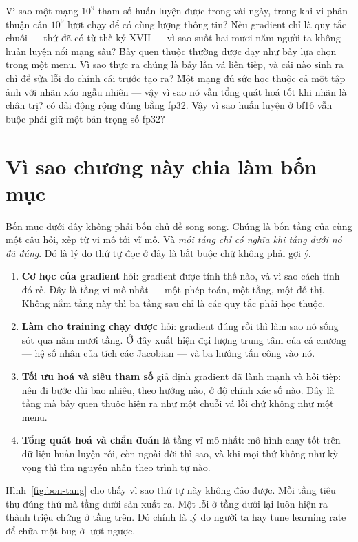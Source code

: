 \documentclass[../../deep_learning.tex]{subfiles}
\begin{document}
\begin{khoigoi}
\h{Vì sao một mạng \(10^9\) tham số huấn luyện được trong vài ngày, trong khi vi phân thuận cần \(10^9\) lượt chạy để có cùng lượng thông tin?}
\h{Nếu gradient chỉ là quy tắc chuỗi --- thứ đã có từ thế kỷ XVII --- vì sao suốt hai mươi năm người ta không huấn luyện nổi mạng sâu?}
\h{Bảy  quen thuộc thường được dạy như bảy lựa chọn trong một menu. Vì sao thực ra chúng là bảy lần vá liên tiếp, và cái nào sinh ra chỉ để sửa lỗi do chính cái trước tạo ra?}
\h{Một mạng đủ sức học thuộc cả một tập ảnh với nhãn xáo ngẫu nhiên --- vậy vì sao nó vẫn tổng quát hoá tốt khi nhãn là chân trị?}
\h{ có dải động rộng đúng bằng fp32. Vậy vì sao huấn luyện ở bf16 vẫn buộc phải giữ một bản trọng số fp32?}
\end{khoigoi}

\section{Vì sao chương này chia làm bốn mục}
Bốn mục dưới đây không phải bốn chủ đề song song. Chúng là bốn tầng của cùng một câu hỏi, xếp từ vi mô tới vĩ mô. Và \emph{mỗi tầng chỉ có nghĩa khi tầng dưới nó đã đúng}. Đó là lý do thứ tự đọc ở đây là bắt buộc chứ không phải gợi ý.

\begin{enumerate}
\item \textbf{Cơ học của gradient} hỏi: gradient được tính thế nào, và vì sao cách tính đó rẻ. Đây là tầng vi mô nhất --- một phép toán, một tầng, một đồ thị. Không nắm tầng này thì ba tầng sau chỉ là các quy tắc phải học thuộc.
\item \textbf{Làm cho training chạy được} hỏi: gradient đúng rồi thì làm sao nó sống sót qua năm mươi tầng. Ở đây xuất hiện đại lượng trung tâm của cả chương --- hệ số nhân của tích các Jacobian --- và ba hướng tấn công vào nó.
\item \textbf{Tối ưu hoá và siêu tham số} giả định gradient đã lành mạnh và hỏi tiếp: nên đi bước dài bao nhiêu, theo hướng nào, ở độ chính xác số nào. Đây là tầng mà bảy  quen thuộc hiện ra như một chuỗi vá lỗi chứ không như một menu.
\item \textbf{Tổng quát hoá và chẩn đoán} là tầng vĩ mô nhất: mô hình chạy tốt trên dữ liệu huấn luyện rồi, còn ngoài đời thì sao, và khi mọi thứ không như kỳ vọng thì tìm nguyên nhân theo trình tự nào.
\end{enumerate}

Hình~\ref{fig:bon-tang} cho thấy vì sao thứ tự này không đảo được. Mỗi tầng tiêu thụ đúng thứ mà tầng dưới sản xuất ra. Một lỗi ở tầng dưới lại luôn hiện ra thành triệu chứng ở tầng trên. Đó chính là lý do người ta hay tune learning rate để chữa một bug ở lượt ngược.
\end{document}

